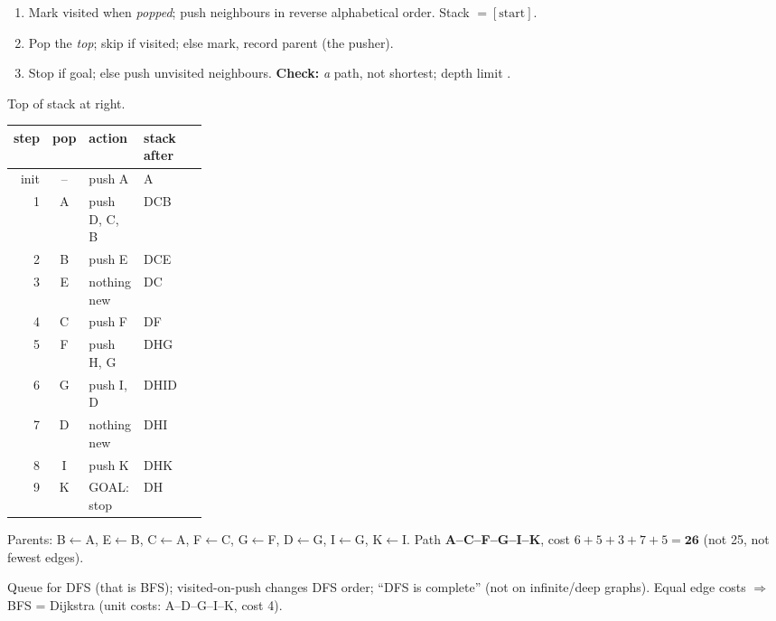 \begin{multicols}{3}
\begin{worked}
\end{worked}
\begin{recipe}
\begin{enumerate}
\item Mark visited when \emph{popped}; push neighbours in reverse alphabetical order. Stack $=[\text{start}]$.
\item Pop the \emph{top}; skip if visited; else mark, record parent (the pusher).
\item Stop if goal; else push unvisited neighbours. \textbf{Check:} \emph{a} path, not shortest; depth limit .
\end{enumerate}
\end{recipe}
\begin{worked}
Top of stack at right.\par\vspace{1pt}
\scriptsize\setlength{\tabcolsep}{2.5pt}
\begin{tabularx}{\linewidth}{@{}rc>{\raggedright\arraybackslash}p{0.25\linewidth}X@{}}\toprule
step & pop & action & stack after\\\midrule
init & -- & push A & A\\
1 & A & push D, C, B & DCB\\
2 & B & push E & DCE\\
3 & E & nothing new & DC\\
4 & C & push F & DF\\
5 & F & push H, G & DHG\\
6 & G & push I, D & DHID\\
7 & D & nothing new & DHI\\
8 & I & push K & DHK\\
9 & K & GOAL: stop & DH\\
\bottomrule\end{tabularx}\par\vspace{1pt}
Parents: B$\leftarrow$A, E$\leftarrow$B, C$\leftarrow$A, F$\leftarrow$C, G$\leftarrow$F, D$\leftarrow$G, I$\leftarrow$G, K$\leftarrow$I. Path \textbf{A--C--F--G--I--K}, cost $6+5+3+7+5=\mathbf{26}$ (not 25, not fewest edges). \chk
\end{worked}
\begin{trap}
Queue for DFS (that is BFS); visited-on-push changes DFS order; ``DFS is complete'' (not on infinite/deep graphs). Equal edge costs $\Rightarrow$ BFS = Dijkstra (unit costs: A--D--G--I--K, cost 4). \chk
\end{trap}


\end{multicols}
